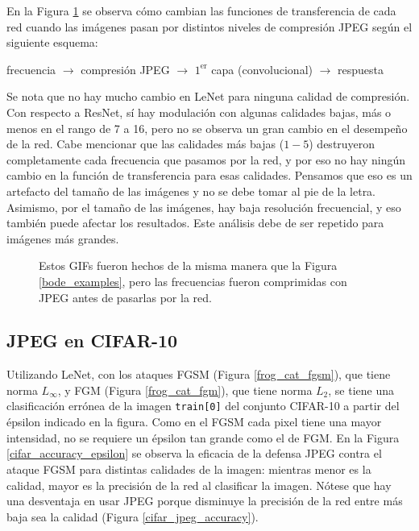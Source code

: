 En la Figura \ref{bode_gifs} se observa cómo cambian las funciones de transferencia de cada red cuando las imágenes pasan por distintos niveles de compresión JPEG según el siguiente esquema:
\begin{center}
    frecuencia $\to$ compresión JPEG $\to$ $1^\text{er}$ capa (convolucional) $\to$ respuesta
\end{center}
Se nota que no hay mucho cambio en LeNet para ninguna calidad de compresión. Con respecto a ResNet, sí hay modulación con algunas calidades bajas, más o menos en el rango de 7 a 16, pero no se observa un gran cambio en el desempeño de la red. Cabe mencionar que las calidades más bajas ($1-5$) destruyeron completamente cada frecuencia que pasamos por la red, y por eso no hay ningún cambio en la función de transferencia para esas calidades. Pensamos que eso es un artefacto del tamaño de las imágenes y no se debe tomar al pie de la letra. Asimismo, por el tamaño de las imágenes, hay baja resolución frecuencial, y eso también puede afectar los resultados. Este análisis debe de ser repetido para imágenes más grandes.
\begin{figure}[h]
    \caption{Estos GIFs fueron hechos de la misma manera que la Figura \ref{bode_examples}, pero las frecuencias fueron comprimidas con JPEG antes de pasarlas por la red.}
    \label{bode_gifs}
\end{figure}



\subsection{JPEG en CIFAR-10}

Utilizando LeNet, con los ataques FGSM (Figura \ref{frog_cat_fgsm}), que tiene norma $L_\infty$, y FGM (Figura \ref{frog_cat_fgm}), que tiene norma $L_2$, se tiene una clasificación errónea de la imagen \texttt{train[0]} del conjunto CIFAR-10 a partir del épsilon indicado en la figura. Como en el FGSM cada pixel tiene una mayor intensidad, no se requiere un épsilon tan grande como el de FGM. En la Figura \ref{cifar_accuracy_epsilon} se observa la eficacia de la defensa JPEG contra el ataque FGSM para distintas calidades de la imagen: mientras menor es la calidad, mayor es la precisión de la red al clasificar la imagen. Nótese que hay una desventaja en usar JPEG porque disminuye la precisión de la red entre más baja sea la calidad (Figura \ref{cifar_jpeg_accuracy}).

